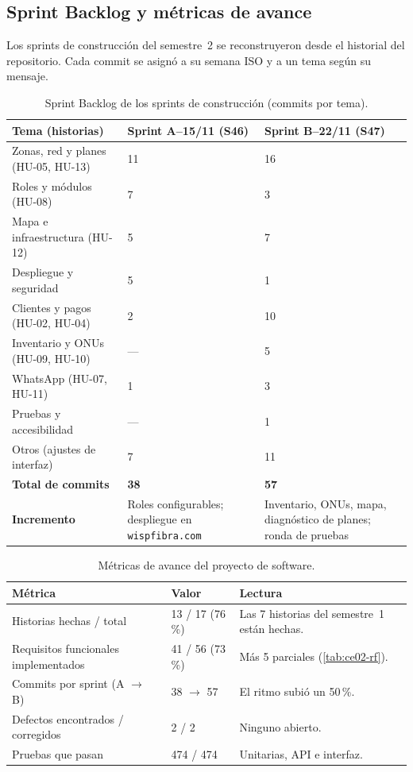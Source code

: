 \subsection{Sprint Backlog y métricas de avance}

Los sprints de construcción del semestre~2 se reconstruyeron desde el historial del
repositorio. Cada commit se asignó a su semana ISO y a un tema según su mensaje.

\begin{table}[H]
\centering
\caption{Sprint Backlog de los sprints de construcción (commits por tema).}
\label{tab:ce02-e4-sprints}
\small
\begin{tabularx}{\textwidth}{XC{2.6cm}C{2.6cm}}
\toprule
\textbf{Tema (historias)} & \textbf{Sprint A}--15/11 (S46) & \textbf{Sprint B}--22/11 (S47) \\
\midrule
Zonas, red y planes (HU-05, HU-13) & 11 & 16 \\
Roles y módulos (HU-08) & 7 & 3 \\
Mapa e infraestructura (HU-12) & 5 & 7 \\
Despliegue y seguridad & 5 & 1 \\
Clientes y pagos (HU-02, HU-04) & 2 & 10 \\
Inventario y ONUs (HU-09, HU-10) & --- & 5 \\
WhatsApp (HU-07, HU-11) & 1 & 3 \\
Pruebas y accesibilidad & --- & 1 \\
Otros (ajustes de interfaz) & 7 & 11 \\
\midrule
\textbf{Total de commits} & \textbf{38} & \textbf{57} \\
\textbf{Incremento} & Roles configurables; despliegue en \texttt{wispfibra.com} & Inventario, ONUs, mapa, diagnóstico de planes; ronda de pruebas \\
\bottomrule
\end{tabularx}
\end{table}

\begin{table}[H]
\centering
\caption{Métricas de avance del proyecto de software.}
\label{tab:ce02-e4-metricas}
\small
\begin{tabularx}{\textwidth}{L{5.6cm}C{2.4cm}X}
\toprule
\textbf{Métrica} & \textbf{Valor} & \textbf{Lectura} \\
\midrule
Historias hechas / total & 13 / 17 (76\,\%) & Las 7 historias del semestre~1 están hechas. \\
Requisitos funcionales implementados & 41 / 56 (73\,\%) & Más 5 parciales (\cref{tab:ce02-rf}). \\
Commits por sprint (A $\rightarrow$ B) & 38 $\rightarrow$ 57 & El ritmo subió un 50\,\%. \\
Defectos encontrados / corregidos & 2 / 2 & Ninguno abierto. \\
Pruebas que pasan & 474 / 474 & Unitarias, API e interfaz. \\
\bottomrule
\end{tabularx}
\end{table}


